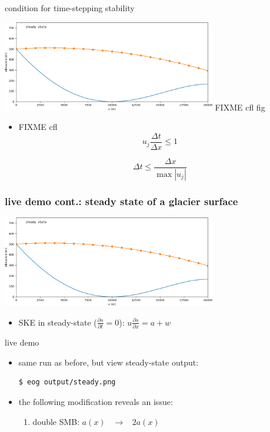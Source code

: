 \documentclass[10pt,dvipsnames]{beamer}
\begin{document}
\begin{frame}{condition for time-stepping stability}
\begin{center}
\includegraphics[width=0.7\textwidth]{steady} FIXME cfl fig
\end{center}

\bigskip
\begin{itemize}
\item FIXME cfl
$$u_j \frac{\Delta t}{\Delta x} \le 1$$

$$\Delta t \le \frac{\Delta x}{\max |u_j|}$$
\end{itemize}
\end{frame}

\begin{frame}[fragile]
\frametitle{live demo cont.: steady state of a glacier surface}
\begin{center}
\includegraphics[width=0.7\textwidth]{steady}
\end{center}

\bigskip
\begin{itemize}
\item SKE in steady-state ($\frac{\partial s}{\partial t}=0$): \quad $\displaystyle u \frac{\partial s}{\partial x} = a + w$
\end{itemize}

\begin{block}{live demo}
\begin{itemize}
\item same run as before, but view steady-state output:
\begin{verbatim}
$ eog output/steady.png
\end{verbatim}
\item the following modification reveals an issue:
    \begin{enumerate}
    \item double SMB: \quad $a(x)$ \, $\to$ \, $2 a(x)$
    \end{enumerate}
\end{itemize}
\end{block}
\end{frame}
\end{document}

